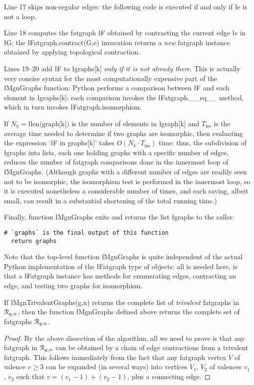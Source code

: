 Line 17 skips non-regular edges: the following code is executed if and
only if \l{e} is not a loop.

Line 18 computes the fatgraph \l{F} obtained by contracting the
current edge \l{e} in \l{G}: the \l{Fatgraph.contract(G,e)} invocation
returns a \emph{new} fatgraph instance obtained by applying
topological contraction.

Lines 19--20 add \l{F} to \l{graphs[k]} \emph{only if it is not
  already there}.  This is actually very concise syntax for the most
computationally expensive part of the \l{MgnGraphs} function: Python
performs a comparison between \l{F} and each element in \l{graphs[k]};
each comparison invokes the \l{Fatgraph.__eq__} method, which in turn
invokes \l{Fatgraph.isomorphism}.

If $N_k = \text{\l{len(graph[k])}}$ is the number of elements in
\l{graph[k]} and $T_\text{iso}$ is the average time needed to
determine if two graphs are isomorphic, then evaluating the expression
`\l{F in graphs[k]}' takes $O(N_k \cdot T_\text{iso})$ time: thus, the
subdivision of \l{graphs} into lists, each one holding graphs with a
specific number of edges, reduces the number of fatgraph comparisons
done in the innermost loop of \l{MgnGraphs}.  (Although graphs with a
different number of edges are readily seen not to be isomorphic, the
isomorphism test is performed in the innermost loop, so it is executed
nonetheless a considerable number of times, and each saving, albeit
small, can result in a substantial shortening of the total running
time.)

Finally, function \l{MgnGraphs} exits and returns the list \l{graphs} to the
caller:
\begin{lstlisting}[name=MgnGraphs,firstnumber=21]
  # `graphs` is the final output of this function
  return graphs
\end{lstlisting}

Note that the top-level function \l{MgnGraphs} is quite independent of
the actual Python implementation of the \l{Fatgraph} type of objects:
all is needed here, is that a \l{Fatgraph} instance has methods for
enumerating edges, contracting an edge, and testing two graphs for
isomorphism.

\begin{lemma}
  If \l{MgnTrivalentGraphs(g,n)} returns the complete list of
  \emph{trivalent} fatgraphs in $\mathcal{R}_{g,n}$, then the function
  \l{MgnGraphs} defined above returns the complete set of fatgraphs
  $\mathcal{R}_{g,n}$.
\end{lemma}
\begin{proof}
  By the above dissection of the algorithm, all we need to prove is
  that any fatgraph in $\mathcal{R}_{g,n}$ can be obtained by a chain of edge
  contractions from a trivalent fatgraph.  This follows immediately
  from the fact that any fatgraph vertex $V$ of valence $v \geq 3$ can
  be expanded (in several ways) into vertices $V_1$, $V_2$ of valences
  $v_1$, $v_2$ such that $v = (v_1 -1) + (v_2 -1)$, plus a connecting
  edge.
\end{proof}



